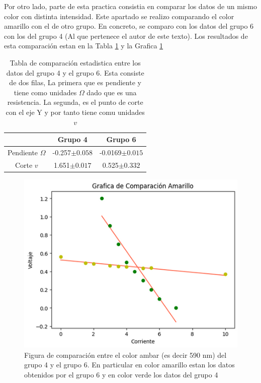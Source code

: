 \documentclass[a4paper, amsfonts, amssymb, amsmath, reprint, showkeys, nofootinbib, twoside]{revtex4-1}
\begin{document}
Por otro lado, parte de esta practica consistia en comparar los datos de un mismo color con distinta intensidad. Este apartado se realizo comparando el color amarillo con el de otro grupo. En concreto, se comparo con los datos del grupo 6 con los del grupo 4 (Al que pertenece el autor de este texto). Los resultados de esta comparación estan en la Tabla \ref{table:Camarillo} y la Grafica \ref{fig:Camarillo}
\begin{table}
   \centering
   \caption{Tabla de comparación estadistica entre los datos del grupo 4 y el grupo 6. Esta consiste de dos filas, La primera que es pendiente y tiene como unidades $\Omega$ dado que es una resistencia. La segunda, es el punto de corte con el eje Y y por tanto tiene comu unidades $v$}
   \label{table:Camarillo}
   \begin{tabular}{|c|c|c|}
      \hline
      \hline
      & Grupo 4 & Grupo 6\\
      \hline
      Pendiente $\Omega$ & -0.257$\pm 0.058$ & -0.0169$\pm 0.015$\\
      Corte $v$ & 1.651$\pm 0.017$& 0.525$\pm 0.332$\\
      \hline
      \hline
   \end{tabular}
\end{table}
\begin{figure}[H]
   \centering
   \includegraphics[scale=0.4]{Grafica_Camarillo.png}
   \caption{Figura de comparación entre el color ambar (es decir 590 nm) del grupo 4 y el grupo 6. En particular en color amarillo estan los datos obtenidos por el grupo 6 y en color verde los datos del grupo 4}
   \label{fig:Camarillo}
\end{figure}
\end{document}
